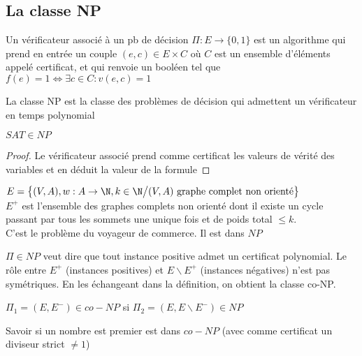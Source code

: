 \subsection{La classe NP}

\begin{definition}[Vérificateur]
	Un vérificateur associé à un pb de décision $\Pi : E \to \{0, 1\}$ est un algorithme qui prend en entrée un couple $(e, c) \in E\times C$ où $C$ est un ensemble d'éléments appelé certificat, et qui renvoie un booléen tel que $f(e) = 1 \Leftrightarrow \exists c \in C : v(e, c) = 1 $
\end{definition}

\begin{definition}[Classe NP]
	La classe NP est la classe des problèmes de décision qui admettent un vérificateur en temps polynomial
\end{definition}

\begin{proposition}
	$SAT \in NP$
\end{proposition}
\begin{proof}
	Le vérificateur associé prend comme certificat les valeurs de vérité des variables et en déduit la valeur de la formule
\end{proof}

\begin{example}
	$E = \left\{(V, A), w : A \to \N, k \in \N \big/ (V, A) \text{ graphe complet non orienté}\right\}$\\
	$E^+$ est l'ensemble des graphes complets non orienté dont il existe un cycle passant par tous les sommets une unique fois et de poids total $\leq k$.\\
	C'est le problème du voyageur de commerce. Il est dans $NP$
\end{example}

\begin{rem}[$NP$ et $co-NP$]
	$\Pi \in NP$ veut dire que tout instance positive admet un certificat polynomial. Le rôle entre $E^+$ (instances positives) et $E \backslash E^+$ (instances négatives) n'est pas symétriques. En les échangeant dans la définition, on obtient la classe co-NP.
\end{rem}

\begin{definition}
	$\Pi_1 = (E, E^-) \in co-NP$ si $\Pi_2 = (E, E \backslash E^-) \in  NP$
\end{definition}

\begin{example}
	Savoir si un nombre est premier est dans $co-NP$ (avec comme certificat un diviseur strict $\neq 1$) 
\end{example}

